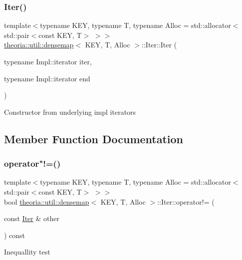 \subsubsection{\texorpdfstring{Iter()}{Iter()}\hspace{0.1cm}{\footnotesize\ttfamily [3/3]}}
{\footnotesize\ttfamily template$<$typename K\+EY, typename T, typename Alloc = std\+::allocator$<$std\+::pair$<$const K\+E\+Y, T$>$ $>$$>$ \\
\hyperlink{classtheoria_1_1util_1_1densemap}{theoria\+::util\+::densemap}$<$ K\+EY, T, Alloc $>$\+::Iter\+::\+Iter (\begin{DoxyParamCaption}\item[{typename Impl\+::iterator}]{iter,  }\item[{typename Impl\+::iterator}]{end }\end{DoxyParamCaption})\hspace{0.3cm}{\ttfamily [inline]}}

Constructor from underlying impl iterators 

\subsection{Member Function Documentation}
\mbox{\label{classtheoria_1_1util_1_1densemap_1_1Iter_a3b85c5cb2f068ade9fcf8c8547aacea3}} 
\subsubsection{\texorpdfstring{operator"!=()}{operator!=()}}
{\footnotesize\ttfamily template$<$typename K\+EY, typename T, typename Alloc = std\+::allocator$<$std\+::pair$<$const K\+E\+Y, T$>$ $>$$>$ \\
bool \hyperlink{classtheoria_1_1util_1_1densemap}{theoria\+::util\+::densemap}$<$ K\+EY, T, Alloc $>$\+::Iter\+::operator!= (\begin{DoxyParamCaption}\item[{const \hyperlink{classtheoria_1_1util_1_1densemap_1_1Iter}{Iter} \&}]{other }\end{DoxyParamCaption}) const\hspace{0.3cm}{\ttfamily [inline]}}

Inequallity test \mbox{\label{classtheoria_1_1util_1_1densemap_1_1Iter_ae290045c043b2c9ea6ff17a91217cb04}} 
